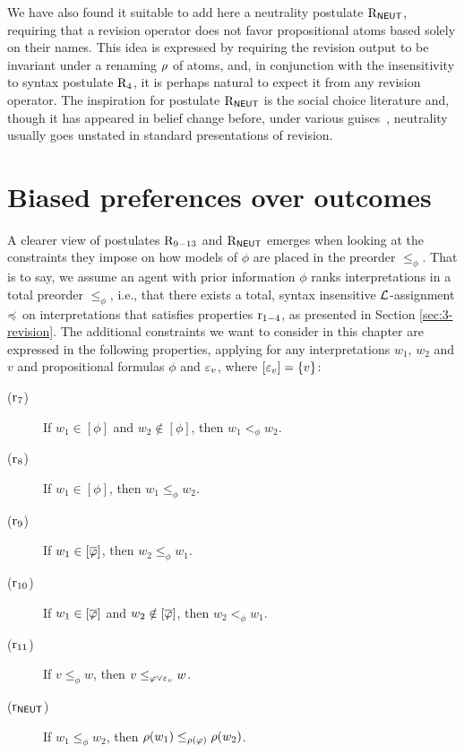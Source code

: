 We have also found it suitable to add here a neutrality postulate $\mathrm{R}_{\mathsf{NEUT}}$, 
requiring that a revision operator does not favor propositional atoms based solely on their names.
This idea is expressed by requiring the revision output to be invariant under a renaming $\rho$ of atoms,
and, in conjunction with the insensitivity to syntax postulate $\mathrm{R}_{4}$,
it is perhaps natural to expect it from any revision operator.
The inspiration for postulate $\mathrm{R}_{\mathsf{NEUT}}$ is
the social choice literature
and, though it has appeared in belief change before, 
under various guises~\cite{HerzigR99,MarquisS14,HaretPW16}, 
neutrality usually goes unstated in standard presentations of revision.

\section{Biased preferences over outcomes}\label{sec:4-assignments}
A clearer view of postulates $\mathrm{R}_{9-13}$ and $\mathrm{R}_{\mathsf{NEUT}}$
emerges when looking at the constraints they impose on how models of $\phi$
are placed in the preorder $\le_\phi$.
That is to say, we assume an agent with prior information $\phi$ ranks interpretations
in a total preorder $\le_\phi$,
i.e., that there exists a total, syntax insensitive $\mathcal{L}$-assignment 
$\preccurlyeq$ on interpretations
that satisfies properties $\mathrm{r}_{1-4}$, as presented in Section \ref{sec:3-revision}.
The additional constraints we want to consider in this chapter
are expressed in the following properties,
applying for any interpretations $w_1$, $w_2$ and $v$
and propositional formulas $\phi$ and $\varepsilon_v$, where $[\varepsilon_v]=\{v\}$:

\begin{description}
	\item[($\mathrm{r}_{7}$)] If $w_1\in[\phi]$ and $w_2\notin[\phi]$, then $w_1<_\phi w_2$.

	\item[($\mathrm{r}_{8}$)] If $w_1\in[\phi]$, then $w_1\le_\phi w_2$.
		
	\item[($\mathrm{r}_{9}$)] If $w_1\in[\overline{\varphi}]$, then $w_2\le_\phi w_1$.
	
	\item[($\mathrm{r}_{10}$)] If $w_1\in[\overline{\varphi}]$ and $w_2\notin[\overline{\varphi}]$, then $w_2<_\phi w_1$.
	
	\item[($\mathrm{r}_{11}$)] If $v\le_\phi w$, then $v\le_{\varphi\lor\varepsilon_v} w$.
	
	\item[($\mathrm{r}_{\mathsf{NEUT}}$)] If $w_1\le_\phi w_2$, then $\rho(w_1)\le_{\rho(\varphi)}\rho(w_2)$.	
\end{description}

